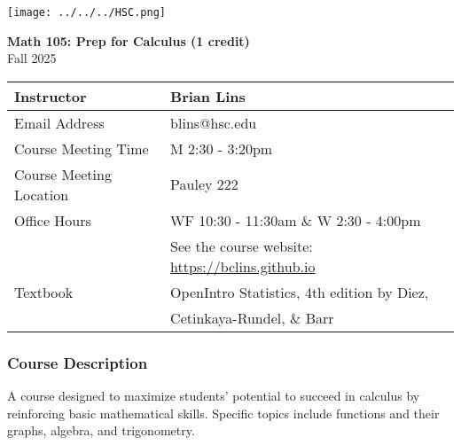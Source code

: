 \documentclass[10pt]{article}
\begin{document}
\noindent
%


\begin{center}
\texttt{[image: ../../../HSC.png]} 
\bigskip

\textbf{Math 105: Prep for Calculus (1 credit)} \\
Fall 2025
\end{center}

\noindent
\begin{tabular}{|l|l|}
\hline
Instructor & Brian Lins \\ \hline
Email Address & blins@hsc.edu \\ \hline
Course Meeting Time & M 2:30 - 3:20pm \\ \hline
Course Meeting Location & Pauley 222 \\ \hline
Office Hours & WF 10:30 - 11:30am \& W 2:30 - 4:00pm \\ 
& See the course website: \url{https://bclins.github.io} ~ \\ \hline
Textbook & OpenIntro Statistics, 4th edition by Diez,\\ &  Cetinkaya-Rundel, \& Barr \\ \hline
\end{tabular}


\subsubsection*{Course Description}

A course designed to maximize students’ potential to succeed in calculus by reinforcing basic mathematical skills. Specific topics include functions and their graphs, algebra, and trigonometry.
\end{document}

